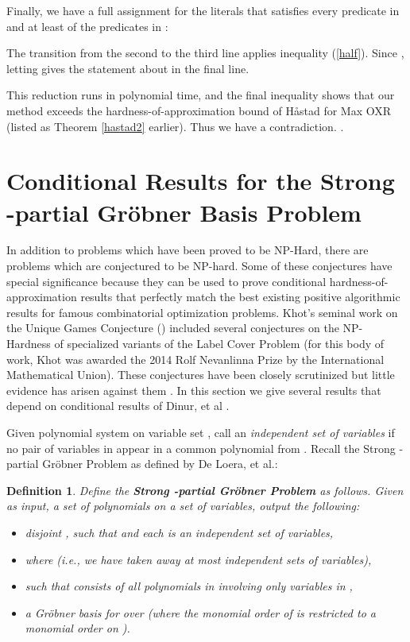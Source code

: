 \documentclass{article}
\newtheorem{definition}[theorem]{Definition}
\begin{document}
Finally, we have a full assignment for the literals  that satisfies every predicate in  and at least  of the predicates in :


The transition from the second to the third line applies inequality (\ref{half}). Since , letting  gives the statement about  in the final line. 

This reduction runs in polynomial time, and the
final inequality shows that our method exceeds the hardness-of-approximation bound of H{\aa}stad for Max OXR (listed as Theorem \ref{hastad2} earlier). Thus we have a contradiction. .









\section{Conditional Results for the Strong -partial Gr\"{o}bner Basis Problem}

In addition to problems which have been proved to be NP-Hard, there are problems which are conjectured to be NP-hard. Some of these conjectures have special significance because they can be used to prove conditional hardness-of-approximation results that perfectly match the best existing positive algorithmic results for famous combinatorial optimization problems. Khot's seminal work on the Unique Games Conjecture (\cite{Khot02}) included several conjectures on the NP-Hardness of specialized variants of the Label Cover Problem (for this body of work, Khot was awarded the 2014 Rolf Nevanlinna Prize by the International Mathematical Union). These conjectures have been closely scrutinized but little evidence has arisen against them \cite{dinur}. In this section we give several results that depend on conditional results of Dinur, et al \cite{dinur}.


Given polynomial system  on variable set , call   an \textit{independent set of variables} if no pair of variables in  appear in a common polynomial from .
Recall the Strong -partial Gr\"{o}bner Problem as defined by De Loera, et al.:

\begin{definition} \citep{deloera}
Define the \textbf{Strong -partial Gr\"{o}bner Problem} as follows. Given as input, a set  of polynomials on a set  of variables, output the following:
\begin{itemize}
\item disjoint , such that  and each  is an independent set of variables,
\item  where  (i.e., we have taken away at most  independent sets of variables),
\item  such that  consists of all polynomials in  involving only variables in ,
\item a Gr\"{o}bner basis for  over  (where the monomial order of  is restricted to a monomial order on ).
\end{itemize}
\end{definition}
\end{document}
